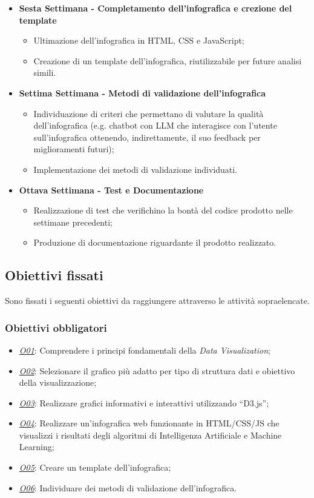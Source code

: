 \begin{itemize}
    \item \textbf{Sesta Settimana - Completamento dell'infografica e crezione del template} 
    \begin{itemize}
        \item Ultimazione dell'infografica in HTML, CSS e JavaScript;
        \item Creazione di un template dell'infografica, riutilizzabile per future analisi simili.
    \end{itemize}
    \item \textbf{Settima Settimana - Metodi di validazione dell'infografica} 
    \begin{itemize}
        \item Individuazione di criteri che permettano di valutare la qualità dell'infografica (e.g. chatbot con LLM che interagisce con l'utente sull'infografica ottenendo, indirettamente, il suo feedback per miglioramenti futuri);
        \item Implementazione dei metodi di validazione individuati.
    \end{itemize}
    \item \textbf{Ottava Settimana - Test e Documentazione} 
    \begin{itemize}
        \item Realizzazione di test che verifichino la bontà del codice prodotto nelle settimane precedenti;
        \item Produzione di documentazione riguardante il prodotto realizzato.
    \end{itemize}
\end{itemize}

\subsection{Obiettivi fissati}
Sono fissati i seguenti obiettivi da raggiungere attraverso le attività sopraelencate.

\subsubsection{Obiettivi obbligatori}
\begin{itemize}
    \item \underline{\textit{O01}}: Comprendere i principi fondamentali della \textit{Data Visualization};
    \item \underline{\textit{O02}}: Selezionare il grafico più adatto per tipo di struttura dati e obiettivo della visualizzazione;
    \item \underline{\textit{O03}}: Realizzare grafici informativi e interattivi utilizzando ``D3.js'';
    \item \underline{\textit{O04}}: Realizzare un'infografica web funzionante in HTML/CSS/JS che visualizzi i risultati degli algoritmi di Intelligenza Artificiale e Machine Learning;
    \item \underline{\textit{O05}}: Creare un template dell'infografica;
    \item \underline{\textit{O06}}: Individuare dei metodi di validazione dell'infografica.
\end{itemize}

